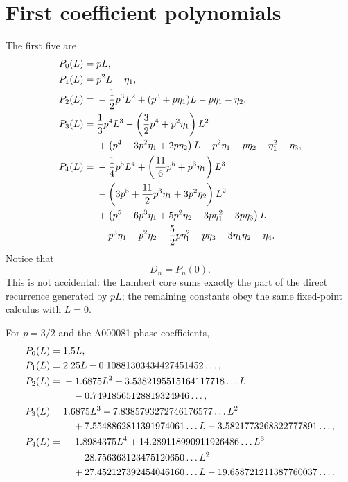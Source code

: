 \documentclass[11pt,a4paper,oneside,openany]{book}
\theoremstyle{definition}
\theoremstyle{remark}
\begin{document}
\section{First coefficient polynomials}
The first five are
\begin{align}
 P_0(L)={}&pL,\label{eq:P0}\\
 P_1(L)={}&p^2L-\eta_1,\label{eq:P1}\\
 P_2(L)={}&-\frac12p^3L^2+(p^3+p\eta_1)L-p\eta_1-\eta_2,
 \label{eq:P2}\\
 P_3(L)={}&\frac13p^4L^3-
 \left(\frac32p^4+p^2\eta_1\right)L^2\notag\\
 &+\left(p^4+3p^2\eta_1+2p\eta_2\right)L
 -p^2\eta_1-p\eta_2-\eta_1^2-\eta_3,
 \label{eq:P3}\\
 P_4(L)={}&-\frac14p^5L^4
 +\left(\frac{11}{6}p^5+p^3\eta_1\right)L^3\notag\\
 &-\left(3p^5+\frac{11}{2}p^3\eta_1+3p^2\eta_2\right)L^2\notag\\
 &+\left(p^5+6p^3\eta_1+5p^2\eta_2
          +3p\eta_1^2+3p\eta_3\right)L\notag\\
 &-p^3\eta_1-p^2\eta_2-\frac52p\eta_1^2-p\eta_3
   -3\eta_1\eta_2-\eta_4.
 \label{eq:P4}
\end{align}
Notice that
\begin{equation}
 D_n=P_n(0).
 \label{eq:D-P0}
\end{equation}
This is not accidental: the Lambert core sums exactly the part of the direct
recurrence generated by $pL$; the remaining constants obey the same fixed-point
calculus with $L=0$.

For $p=3/2$ and the A000081 phase coefficients,
\begin{align}
 P_0(L)={}&1.5L,\notag\\
 P_1(L)={}&2.25L-0.10881303434427451452\ldots,\notag\\
 P_2(L)={}&-1.6875L^2+3.5382195515164117718\ldots L\notag\\
          &\quad-0.74918565128819324946\ldots,\notag\\
 P_3(L)={}&1.6875L^3-7.8385793272746176577\ldots L^2\notag\\
          &\quad+7.5548862811391974061\ldots L
            -3.5821773268322777891\ldots,\notag\\
 P_4(L)={}&-1.8984375L^4+14.289118990911926486\ldots L^3\notag\\
          &\quad-28.756363123475120650\ldots L^2\notag\\
          &\quad+27.452127392454046160\ldots L
            -19.658721211387760037\ldots .
 \label{eq:P-numeric}
\end{align}
\end{document}
